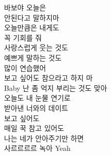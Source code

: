\documentclass{oblivoir}
\begin{document}
\noindent 바보야 오늘은\\
안된다고 말하지마\\
오늘만큼은 내게도\\
꼭 기회를 줘\\
사랑스럽게 웃는 것도\\
예쁘게 말하는 것도\\
많이 연습했어\\
보고 싶어도 참으라고 하지 마\\

\noindent Baby 난 좀 억지 부리는 것도 맞아\\
오늘도 내 눈물 연기로\\
받아낸 너와의 데이트\\
보고 싶어도\\
매일 꾹 참고 있어도\\
나는 네가 안아주기만 하면\\
사르르르르 녹아 Yeah
\end{document}
